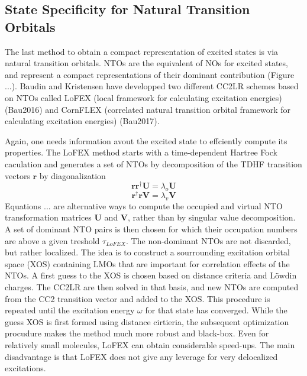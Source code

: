 
 
\subsection{State Specificity for Natural Transition Orbitals}

The last method to obtain a compact representation of excited states is via natural transition orbitals. NTOs are the equivalent of NOs for excited states, and represent a compact representations of their dominant contribution (Figure ...). Baudin and Kristensen have developped two different CC2LR schemes based on NTOs called LoFEX (local framework for calculating excitation energies) (Bau2016) and CornFLEX (correlated natural transition orbital framework for calculating excitation energies) (Bau2017). 

Again, one needs information avout the excited state to effciently compute its properties. The LoFEX method starts with a time-dependent Hartree Fock caculation and generates a set of NTOs by decomposition of the TDHF transition vectors $\mathbf{r}$ by diagonalization
\begin{equation}
\mathbf{r} \mathbf{r}^{\dagger} \mathbf{U} = \lambda_o \mathbf{U}
\end{equation}
\begin{equation}
\mathbf{r}^{\dagger} \mathbf{r} \mathbf{V} = \lambda_v \mathbf{V}
\end{equation}
\noindent Equations ... are alternative ways to compute the occupied and virtual NTO transformation matrices $\mathbf{U}$ and $\mathbf{V}$, rather than by singular value decomposition. A set of dominant NTO pairs is then chosen for which their occupation numbers are above a given treshold $\tau_{LoFEX}$. The non-dominant NTOs are not discarded, but rather localized. The idea is to construct a sourrounding excitation orbital space (XOS) containing LMOs that are important for correlation effects of the NTOs. A first guess to the XOS is chosen based on distance criteria and Löwdin charges. The CC2LR are then solved in that basis, and new NTOs are computed from the CC2 transition vector and added to the XOS. This procedure is repeated until the excitation energy $\omega$ for that state has converged. While the guess XOS is first formed using distance cirtieria, the subsequent optimization procudure makes the method much more robust and black-box. Even for relatively small molecules, LoFEX can obtain considerable speed-ups. The main disadvantage is that LoFEX does not give any leverage for very delocalized excitations. 


